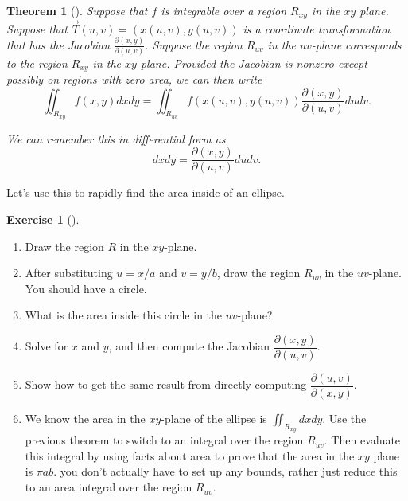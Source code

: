 \documentclass[10pt,]{book}
\theoremstyle{plain}
\newtheorem{theorem}{Theorem}[section]
\theoremstyle{definition}
\theoremstyle{definition}
\theoremstyle{definition}
\theoremstyle{definition}
\newtheorem{exploration}[project]{Exercise}
\theoremstyle{definition}
\numberwithin{equation}{section}
\newcommand{\ds}{\displaystyle}
\begin{document}
\begin{theorem}[{}]\label{theorem-11}
Suppose that \(f\) is integrable over a region \(R_{xy}\) in the \(xy\) plane. Suppose that \(\vec T(u,v)=(x(u,v),y(u,v))\) is a coordinate transformation that has the Jacobian \(\ds \frac{\partial (x,y)}{\partial (u,v)}\). Suppose the region \(R_{uv}\) in the \(uv\)-plane corresponds to the region \(R_{xy}\) in the \(xy\)-plane. Provided the Jacobian is nonzero except possibly on regions with zero area, we can then write%
\begin{equation*}
\iint_{R_{xy}} f(x,y) dxdy = \iint_{R_{uv}} f(x(u,v),y(u,v)) \frac{\partial (x,y)}{\partial (u,v)} dudv.
\end{equation*}
%
\par
We can remember this in differential form as%
\begin{equation*}
dxdy = \frac{\partial (x,y)}{\partial (u,v)} dudv.
\end{equation*}
%
\end{theorem}
Let's use this to rapidly find the area inside of an ellipse.%
\begin{exploration}[]\label{exploration-269}
\leavevmode%
\begin{enumerate}[font=\bfseries,label=(\alph*),ref=\alph*]
\item\label{task-726} Draw the region \(R\) in the \(xy\)-plane.%
\item\label{task-727} After substituting \(u=x/a\) and \(v=y/b\), draw the region \(R_{uv}\) in the \(uv\)-plane.  You should have a circle.%
\item\label{task-728} What is the area inside this circle in the \(uv\)-plane?%
\item\label{task-729} Solve for \(x\) and \(y\), and then compute the Jacobian  \(\dfrac{\partial (x,y)}{\partial (u,v)}\).%
\item\label{task-730} Show how to get the same result from directly computing \(\dfrac{\partial (u,v)}{\partial (x,y)}\).%
\item\label{task-731} We know the area in the \(xy\)-plane of the ellipse is \(\iint_{R_{xy}} dxdy\). Use the previous theorem to switch to an integral over the region \(R_{uv}\).  Then evaluate this integral by using facts about area to prove that the area in the \(xy\) plane is \(\pi a b\). you don't actually have to set up any bounds, rather just reduce this to an area integral over the region \(R_{uv}\).%
%
\end{enumerate}
\end{exploration}
\end{document}
